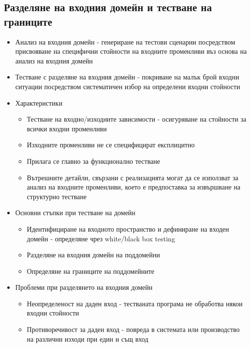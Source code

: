 \documentclass[fleqn,12pt]{article}
\begin{document}
\begin{flushleft}
\subsection{Разделяне на входния домейн и тестване на границите}
    \begin{itemize}
        \item Анализ на входния домейн - генериране на тестови сценарии посредством присвояване на специфични стойности на входните променливи въз основа на анализ на входния домейн
        \item Тестване с разделяне на входния домейн - покриване на малък брой входни ситуации посредством систематичен избор на определени входни стойности
        \item Характеристики
            \begin{itemize}
                \item Тестване на входно/изходните зависимости - осигуряване на стойности за всички входни променливи
                \item Изходните променливи не се специфицират експлицитно
                \item Прилага се главно за функционално тестване
                \item Вътрешните детайли, свързани с реализацията могат да се използват за анализ на входните променливи, което е предпоставка за извършване на структурно тестване
            \end{itemize}
        \item Основни стъпки при тестване на домейн
            \begin{itemize}
                \item Идентифициране на входното пространство и дефиниране на входен домейн - определяне чрез white/black box testing
                \item Разделяне на входния домейн на поддомейни
                \item Определяне на границите на поддомейните
            \end{itemize}
        \item Проблеми при разделянето на входния домейн
            \begin{itemize}
                \item Неопределеност на даден вход - тестваната програма не обработва някои входни стойности
                \item Противоречивост за даден вход - повреда в системата или производство на различни изходи при един и същ вход
            \end{itemize}

\end{itemize}
\end{flushleft}
\end{document}
